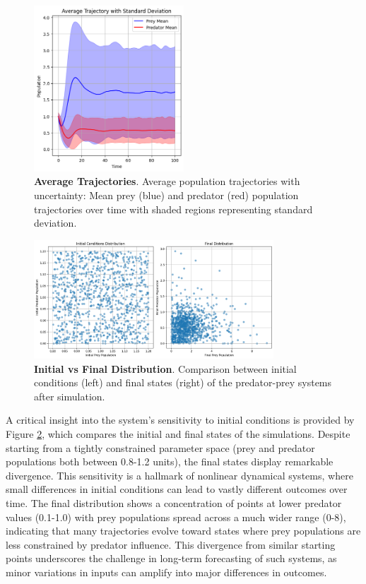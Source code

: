 \documentclass{article}
\begin{document}
\begin{figure} [H]
    \centering
    \includegraphics[width=0.5\textwidth]{overview_distribution}
    \caption{\textbf{Average Trajectories}. Average population trajectories with uncertainty: Mean prey (blue) and predator (red) population trajectories over time with shaded regions representing standard deviation.}
    \label{fig:average_trajectories}
\end{figure}

\begin{figure} [H]
    \centering
    \includegraphics[width=0.8\textwidth]{initial_final_distribution}
    \caption{\textbf{Initial vs Final Distribution}. Comparison between initial conditions (left) and final states (right) of the predator-prey systems after simulation.}
    \label{fig:initial}
\end{figure}

A critical insight into the system's sensitivity to initial conditions is provided by Figure \ref{fig:initial}, which compares the initial and final states of the simulations. Despite starting from a tightly constrained parameter space (prey and predator populations both between 0.8-1.2 units), the final states display remarkable divergence. This sensitivity is a hallmark of nonlinear dynamical systems, where small differences in initial conditions can lead to vastly different outcomes over time. The final distribution shows a concentration of points at lower predator values (0.1-1.0) with prey populations spread across a much wider range (0-8), indicating that many trajectories evolve toward states where prey populations are less constrained by predator influence. This divergence from similar starting points underscores the challenge in long-term forecasting of such systems, as minor variations in inputs can amplify into major differences in outcomes.
\end{document}
